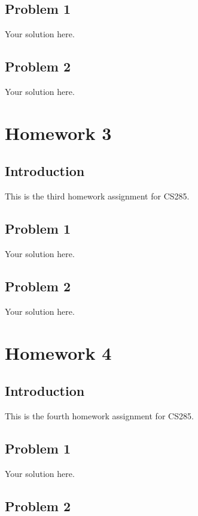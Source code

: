 \documentclass[12pt,oneside]{book}
\begin{document}
\section{Problem 1}

Your solution here.

\section{Problem 2}

Your solution here.

\chapter{Homework 3}

\section{Introduction}

This is the third homework assignment for CS285.

\section{Problem 1}

Your solution here.

\section{Problem 2}

Your solution here.

\chapter{Homework 4}

\section{Introduction}

This is the fourth homework assignment for CS285.

\section{Problem 1}

Your solution here.

\section{Problem 2}
\end{document}
